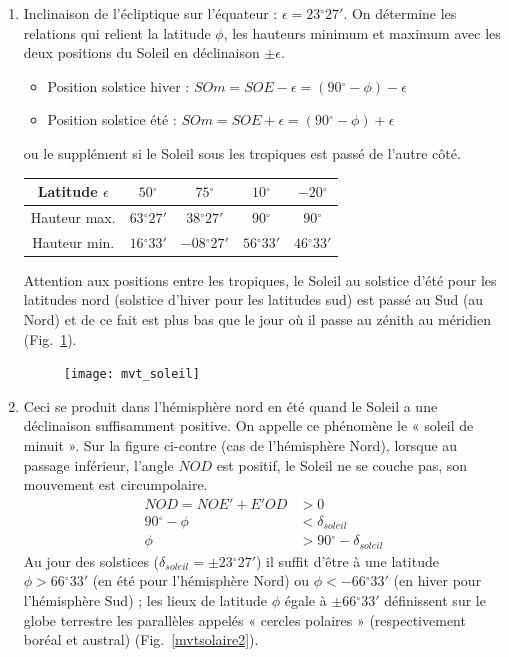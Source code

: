 \documentclass[a4paper,10pt]{report}
\renewcommand{\deg}{\ensuremath{^{\circ}}}
\begin{document}
\begin{Answer}
  \begin{enumerate}
  \item Inclinaison de l'écliptique sur l'équateur :
    $\epsilon=23\deg27'$. On détermine les relations qui relient la
    latitude $\phi$, les hauteurs minimum et maximum avec les deux
    positions du Soleil en déclinaison $\pm \epsilon$.
    \begin{itemize}
    \item Position solstice hiver : $SOm = SOE - \epsilon =
      (90\deg-\phi) -\epsilon$
    \item Position solstice été : $SOm = SOE + \epsilon =
      (90\deg-\phi) +\epsilon$
    \end{itemize}
    ou le supplément si le Soleil sous les tropiques est passé de
    l'autre côté.
    \begin{center}
      \begin{tabular}{|c|c|c|c|c|}
        \hline
        Latitude $\epsilon$ & $50\deg$ & $75\deg$ & $10\deg$ &
        $-20\deg$ \\
        \hline
        Hauteur max. & $63\deg27'$ & $38\deg27'$ & $90\deg$ &
        $90\deg$ \\
        \hline
        Hauteur min. & $16\deg33'$ & $-08\deg27'$ & $56\deg33'$
        & $46\deg33'$ \\
        \hline
      \end{tabular}
    \end{center}
    Attention aux positions entre les tropiques, le Soleil au solstice
    d'été pour les latitudes nord (solstice d'hiver pour les latitudes
    sud) est passé au Sud (au Nord) et de ce fait est plus bas que le
    jour où il passe au zénith au méridien (Fig.~\ref{mvtsolaire}).

    \begin{figure}%
      \centering
      \texttt{[image: mvt\_soleil]}
      \label{mvtsolaire}
      \caption{}
    \end{figure}

  \item Ceci se produit dans l'hémisphère nord en été quand le Soleil
    a une déclinaison suffisamment positive. On appelle ce phénomène
    le « soleil de minuit ». Sur la figure ci-contre (cas de
    l'hémisphère Nord), lorsque au passage inférieur, l'angle $NOD$
    est positif, le Soleil ne se couche pas, son mouvement est
    circumpolaire.
    \begin{align*}
      NOD = NOE' + E'OD &> 0 \\
      90\deg - \phi &< \delta_{soleil} \\
      \phi &> 90\deg - \delta_{soleil}
    \end{align*}
    Au jour des solstices ($\delta_{soleil} = \pm 23\deg27'$) il
    suffit d'être à une latitude $\phi > 66\deg33'$ (en été pour
    l'hémisphère Nord) ou $\phi < - 66\deg33'$ (en hiver pour
    l'hémisphère Sud) ; les lieux de latitude $\phi$ égale à $\pm
    66\deg33'$ définissent sur le globe terrestre les parallèles
    appelés « cercles polaires » (respectivement boréal et austral)
    (Fig.~\ref{mvtsolaire2}).


\end{enumerate}
\end{Answer}
\end{document}
